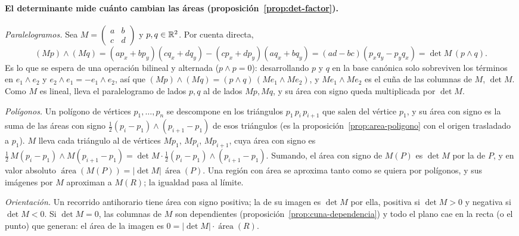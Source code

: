 \paragraph{El determinante mide cuánto cambian las áreas
(proposición~\ref{prop:det-factor}).}
\begin{demostracion}
\emph{Paralelogramos.} Sea \(M=\left(\begin{smallmatrix}a&b\\c&d\end{smallmatrix}\right)\) y
\(p,q\in\mathbb{R}^2\). Por cuenta directa,
\[
  (Mp)\wedge(Mq)=(ap_x+bp_y)(cq_x+dq_y)-(cp_x+dp_y)(aq_x+bq_y)
  =(ad-bc)(p_xq_y-p_yq_x)=\det M\,(p\wedge q).
\]
Es lo que se espera de una operación bilineal y alternada (\(p\wedge p=0\)): desarrollando
\(p\) y \(q\) en la base canónica solo sobreviven los términos en \(e_1\wedge e_2\) y
\(e_2\wedge e_1=-e_1\wedge e_2\), así que \((Mp)\wedge(Mq)=(p\wedge q)\,(Me_1\wedge Me_2)\),
y \(Me_1\wedge Me_2\) es el cuña de las columnas de \(M\), \(\det M\). Como \(M\) es lineal,
lleva el paralelogramo de lados \(p,q\) al de lados \(Mp,Mq\), y su área con signo queda
multiplicada por \(\det M\).

\emph{Polígonos.} Un polígono de vértices \(p_1,\dots,p_n\) se descompone en los triángulos
\(p_1\,p_i\,p_{i+1}\) que salen del vértice \(p_1\), y su área con signo es la suma de las
áreas con signo \(\tfrac12(p_i-p_1)\wedge(p_{i+1}-p_1)\) de esos triángulos (es la
proposición~\ref{prop:area-poligono} con el origen trasladado a \(p_1\)). \(M\) lleva cada
triángulo al de vértices \(Mp_1\), \(Mp_i\), \(Mp_{i+1}\), cuya área con signo es
\(\tfrac12\,M(p_i-p_1)\wedge M(p_{i+1}-p_1)=\det M\cdot\tfrac12(p_i-p_1)\wedge(p_{i+1}-p_1)\).
Sumando, el área con signo de \(M(P)\) es \(\det M\) por la de \(P\), y en valor absoluto
\(\operatorname{área}(M(P))=|\det M|\,\operatorname{área}(P)\). Una región con área se
aproxima tanto como se quiera por polígonos, y sus imágenes por \(M\) aproximan a \(M(R)\);
la igualdad pasa al límite.

\emph{Orientación.} Un recorrido antihorario tiene área con signo positiva; la de su imagen
es \(\det M\) por ella, positiva si \(\det M>0\) y negativa si \(\det M<0\). Si
\(\det M=0\), las columnas de \(M\) son dependientes
(proposición~\ref{prop:cuna-dependencia}) y todo el plano cae en la recta (o el punto) que
generan: el área de la imagen es \(0=|\det M|\cdot\operatorname{área}(R)\).


\end{demostracion}
